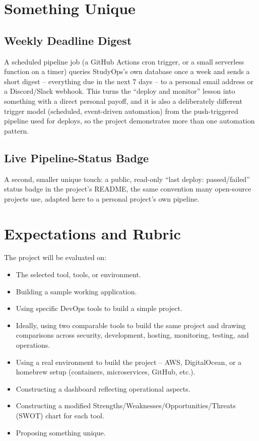 \section{Something Unique}
\label{Section:Unique}
\subsection{Weekly Deadline Digest}
A scheduled pipeline job (a GitHub Actions cron trigger, or a small
serverless function on a timer) queries StudyOps's own database once a week
and sends a short digest -- everything due in the next 7 days -- to a
personal email address or a Discord/Slack webhook. This turns the
``deploy and monitor'' lesson into something with a direct personal payoff,
and it is also a deliberately different trigger model (scheduled,
event-driven automation) from the push-triggered pipeline used for deploys,
so the project demonstrates more than one automation pattern.

\subsection{Live Pipeline-Status Badge}
A second, smaller unique touch: a public, read-only ``last deploy:
passed/failed'' status badge in the project's README, the same convention
many open-source projects use, adapted here to a personal project's own
pipeline.

\section{Expectations and Rubric}
The project will be evaluated on:
\begin{itemize}
\item The selected tool, tools, or environment.
\item Building a sample working application.
\item Using specific DevOps tools to build a simple project.
\item Ideally, using two comparable tools to build the same project and drawing comparisons across security, development, hosting, monitoring, testing, and operations.
\item Using a real environment to build the project -- AWS, DigitalOcean, or a homebrew setup (containers, microservices, GitHub, etc.).
\item Constructing a dashboard reflecting operational aspects.
\item Constructing a modified Strengths/Weaknesses/Opportunities/Threats (SWOT) chart for each tool.
\item Proposing something unique.
\end{itemize}

